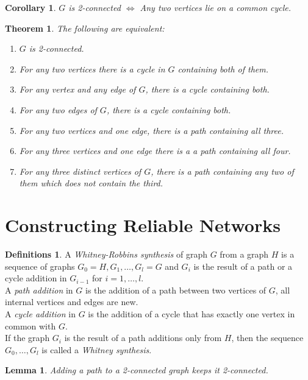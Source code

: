 \documentclass{article}
\newtheorem*{thm}{Theorem}
\newtheorem*{lem}{Lemma}
\newtheorem*{cor}{Corollary}
\theoremstyle{definition}
\newtheorem*{defns}{Definitions}
\begin{document}
\begin{cor}
$G$ is 2-connected $\iff$ Any two vertices lie on a common cycle.
\end{cor}

\begin{thm}
The following are equivalent:
\begin{enumerate}
\item $G$ is 2-connected.
\item For any two vertices there is a cycle in $G$ containing both of them.
\item For any vertex and any edge of $G$, there is a cycle containing both.
\item For any two edges of $G$, there is a cycle containing both.
\item For any two vertices and one edge, there is a path containing all three.
\item For any three vertices and one edge there is a a path containing all four.
\item For any three distinct vertices of $G$, there is a path containing any two of them which does not contain the third.
\end{enumerate}
\end{thm}

\section{Constructing Reliable Networks}

\begin{defns}
A \emph{Whitney-Robbins synthesis} of graph $G$ from a graph $H$ is a sequence of graphs $G_0=H,G_1,\ldots,G_l=G$ and $G_i$ is the result of a path or a cycle addition in $G_{i-1}$ for $i=1,\ldots,l$. \\
A \emph{path addition} in $G$ is the addition of a path between two vertices of $G$, all internal vertices and edges are new. \\
A \emph{cycle addition} in $G$ is the addition of a cycle that has exactly one vertex in common with $G$. \\
If the graph $G_i$ is the result of a path additions only from $H$, then the sequence $G_0,\ldots,G_l$ is called a \emph{Whitney synthesis}.
\end{defns}


\begin{lem}
Adding a path to a 2-connected graph keeps it 2-connected.
\end{lem}
\end{document}
